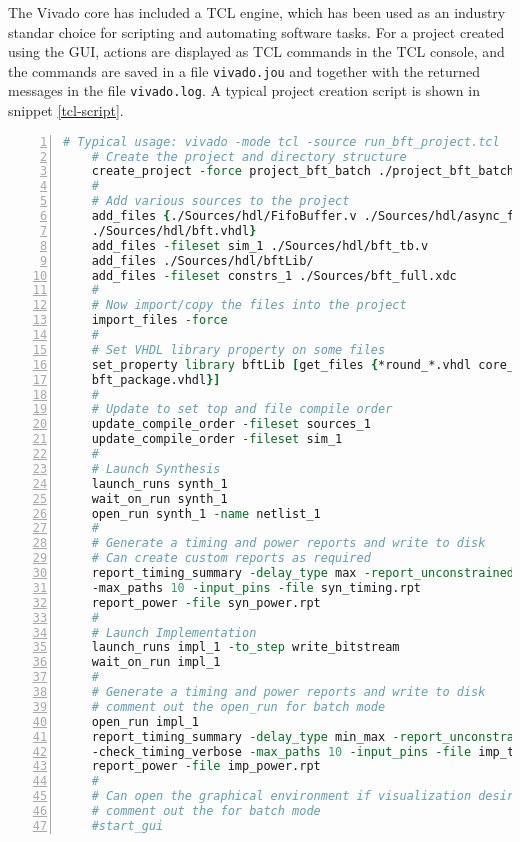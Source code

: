 The Vivado core has included a TCL engine, which has been used as an industry standar choice for
scripting and automating software tasks. For a project created using the GUI, actions are displayed
as TCL commands in the TCL console, and the commands are saved in a file \texttt{vivado.jou} and
together with the returned messages in the file \texttt{vivado.log}. A typical project creation
script is shown in snippet \ref{tcl-script}.

\begin{lstlisting}[language=tcl, basicstyle=\scriptsize\ttfamily, tabsize=2,
	commentstyle=\color{darkgray}, keywordstyle=\color{blue}, backgroundcolor=\color{lightgray},
	morekeywords={create_project, add_files, import_files, set_property, update_compile_order,
	launch_runs, wait_on_run, open_run, report_timming_summary, report_power}, breaklines=true,
	numbers=left, float=htb,
	caption={[TCL project creation example]TCL project creation example, from \cite{UG895}},
	label={tcl-script}]
	# Typical usage: vivado -mode tcl -source run_bft_project.tcl
	# Create the project and directory structure
	create_project -force project_bft_batch ./project_bft_batch -part xc7z010-clg225-1
	#
	# Add various sources to the project
	add_files {./Sources/hdl/FifoBuffer.v ./Sources/hdl/async_fifo.v \
	./Sources/hdl/bft.vhdl}
	add_files -fileset sim_1 ./Sources/hdl/bft_tb.v
	add_files ./Sources/hdl/bftLib/
	add_files -fileset constrs_1 ./Sources/bft_full.xdc
	#
	# Now import/copy the files into the project
	import_files -force
	#
	# Set VHDL library property on some files
	set_property library bftLib [get_files {*round_*.vhdl core_transform.vhdl \
	bft_package.vhdl}]
	#
	# Update to set top and file compile order
	update_compile_order -fileset sources_1
	update_compile_order -fileset sim_1
	#
	# Launch Synthesis
	launch_runs synth_1
	wait_on_run synth_1
	open_run synth_1 -name netlist_1
	#
	# Generate a timing and power reports and write to disk
	# Can create custom reports as required
	report_timing_summary -delay_type max -report_unconstrained -check_timing_verbose \
	-max_paths 10 -input_pins -file syn_timing.rpt
	report_power -file syn_power.rpt
	#
	# Launch Implementation
	launch_runs impl_1 -to_step write_bitstream
	wait_on_run impl_1
	#
	# Generate a timing and power reports and write to disk
	# comment out the open_run for batch mode
	open_run impl_1
	report_timing_summary -delay_type min_max -report_unconstrained \
	-check_timing_verbose -max_paths 10 -input_pins -file imp_timing.rpt
	report_power -file imp_power.rpt
	#
	# Can open the graphical environment if visualization desired
	# comment out the for batch mode
	#start_gui
\end{lstlisting}

